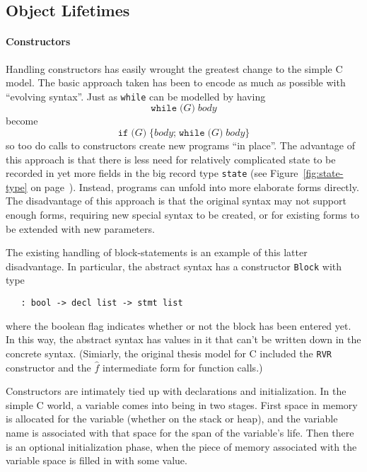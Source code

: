 \documentclass[11pt]{article}
\begin{document}
\subsection{Object Lifetimes}
\label{sec:object-lifetimes}

\paragraph{Constructors}
Handling constructors has easily wrought the greatest change to the
simple C model.  The basic approach taken has been to encode as much
as possible with ``evolving syntax''.  Just as \texttt{while} can be
modelled by having
\[
\texttt{while}\;\texttt{(}G\texttt{)}\;\mathit{body}
\] become \[
\texttt{if}\;\texttt{(}G\texttt{)}\;\texttt{\{}\mathit{body}\texttt{;}\;\texttt{while}\;\texttt{(}G\texttt{)}\;\mathit{body} \texttt{\}}
\]
so too do calls to \cpp{} constructors create new programs ``in
place''.  The advantage of this approach is that there is less need
for relatively complicated state to be recorded in yet more fields in
the big record type \texttt{state} (see Figure~\ref{fig:state-type} on
page~\pageref{fig:state-type}).  Instead, programs can unfold into
more elaborate forms directly.  The disadvantage of this approach is
that the original syntax may not support enough forms, requiring new
special syntax to be created, or for existing forms to be extended
with new parameters.

The existing handling of block-statements is an example of this latter
disadvantage.  In particular, the abstract syntax has a constructor
\texttt{Block} with type
\begin{verbatim}
   : bool -> decl list -> stmt list
\end{verbatim}
where the boolean flag indicates whether or not the block has been
entered yet.  In this way, the abstract syntax has values in it that
can't be written down in the concrete syntax.  (Simiarly, the original
thesis model for C included the \texttt{RVR} constructor and the
$\hat{f}$ intermediate form for function calls.)

Constructors are intimately tied up with declarations and
initialization.  In the simple C world, a variable comes into being in
two stages.  First space in memory is allocated for the variable
(whether on the stack or heap), and the variable name is associated
with that space for the span of the variable's life.  Then there is an
optional initialization phase, when the piece of memory associated
with the variable space is filled in with some value.
\end{document}
